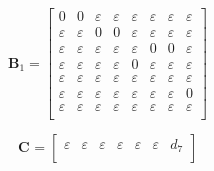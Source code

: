 \documentclass[11pt, a4paper, fleqn]{article}
\begin{document}
\begin{equation*}
\mathbf{B}_{1} = 
\left[\begin{array}{ cccccccc }
0	&0	&\varepsilon	&\varepsilon	&\varepsilon	&\varepsilon	&\varepsilon	&\varepsilon\\
\varepsilon	&\varepsilon	&0	&0	&\varepsilon	&\varepsilon	&\varepsilon	&\varepsilon\\
\varepsilon	&\varepsilon	&\varepsilon	&\varepsilon	&\varepsilon	&0	&0	&\varepsilon\\
\varepsilon	&\varepsilon	&\varepsilon	&\varepsilon	&0	&\varepsilon	&\varepsilon	&\varepsilon\\
\varepsilon	&\varepsilon	&\varepsilon	&\varepsilon	&\varepsilon	&\varepsilon	&\varepsilon	&\varepsilon\\
\varepsilon	&\varepsilon	&\varepsilon	&\varepsilon	&\varepsilon	&\varepsilon	&\varepsilon	&0\\
\varepsilon	&\varepsilon	&\varepsilon	&\varepsilon	&\varepsilon	&\varepsilon	&\varepsilon	&\varepsilon\\
\end{array}\right]
\end{equation*}

\begin{equation*}
\mathbf{C}_{{}} = 
\left[\begin{array}{ ccccccc }
\varepsilon	&\varepsilon	&\varepsilon	&\varepsilon	&\varepsilon	&\varepsilon	&d_7\\
\end{array}\right]
\end{equation*}
\end{document}
